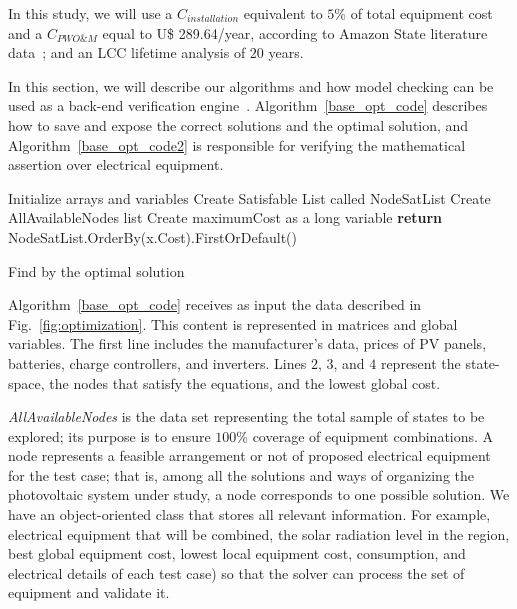 \documentclass[a4paper,donotrepeattitle,fleqn]{cas-dc}
\begin{document}
In this study, we will use a $C_{installation}$ equivalent to $5$\% of total equipment cost and a $C_{PWO\&M}$ equal to U\$ 289.64/year, according to Amazon State literature data~\cite{Agrener2013}; and an LCC lifetime analysis of $20$ years.

In this section, we will describe our algorithms and how model checking can be used as a back-end verification engine~\cite{DBLP:journals/corr/abs-1909-13139}. Algorithm~\ref{base_opt_code} describes how to save and expose the correct solutions and the optimal solution, and Algorithm~\ref{base_opt_code2} is responsible for verifying the mathematical assertion over electrical equipment.

\begin{algorithm}[ht]
\SetAlgoLined
{}
Initialize arrays and variables\;
Create Satisfable List called NodeSatList\;
Create AllAvailableNodes list\;
Create maximumCost as a long variable\;
\textbf{return} NodeSatList.OrderBy(x.Cost).FirstOrDefault()
\caption{Find by the optimal solution}
\label{base_opt_code}
\end{algorithm}

Algorithm~\ref{base_opt_code} receives as input the data described in Fig.~\ref{fig:optimization}. This content is represented in matrices and global variables. The first line includes the manufacturer's data, prices of PV panels, batteries, charge controllers, and inverters. Lines $2$, $3$, and $4$ represent the state-space, the nodes that satisfy the equations, and the lowest global cost.

\textit{AllAvailableNodes} is the data set representing the total sample of states to be explored; its purpose is to ensure $100$\% coverage of equipment combinations. A node represents a feasible arrangement or not of proposed electrical equipment for the test case; that is, among all the solutions and ways of organizing the photovoltaic system under study, a node corresponds to one possible solution. We have an object-oriented class that stores all relevant information. For example, electrical equipment that will be combined, the solar radiation level in the region, best global equipment cost, lowest local equipment cost, consumption, and electrical details of each test case) so that the solver can process the set of equipment and validate it.
\end{document}
